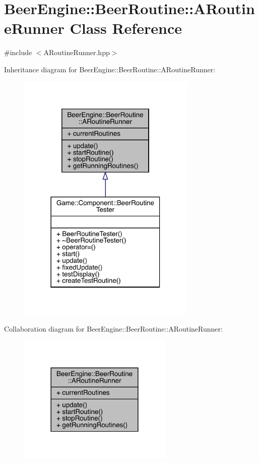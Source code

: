 \hypertarget{class_beer_engine_1_1_beer_routine_1_1_a_routine_runner}{}\section{Beer\+Engine\+:\+:Beer\+Routine\+:\+:A\+Routine\+Runner Class Reference}
\label{class_beer_engine_1_1_beer_routine_1_1_a_routine_runner}


{\ttfamily \#include $<$A\+Routine\+Runner.\+hpp$>$}



Inheritance diagram for Beer\+Engine\+:\+:Beer\+Routine\+:\+:A\+Routine\+Runner\+:\nopagebreak
\begin{figure}[H]
\begin{center}
\leavevmode
\includegraphics[width=242pt]{class_beer_engine_1_1_beer_routine_1_1_a_routine_runner__inherit__graph}
\end{center}
\end{figure}


Collaboration diagram for Beer\+Engine\+:\+:Beer\+Routine\+:\+:A\+Routine\+Runner\+:\nopagebreak
\begin{figure}[H]
\begin{center}
\leavevmode
\includegraphics[width=209pt]{class_beer_engine_1_1_beer_routine_1_1_a_routine_runner__coll__graph}
\end{center}
\end{figure}
